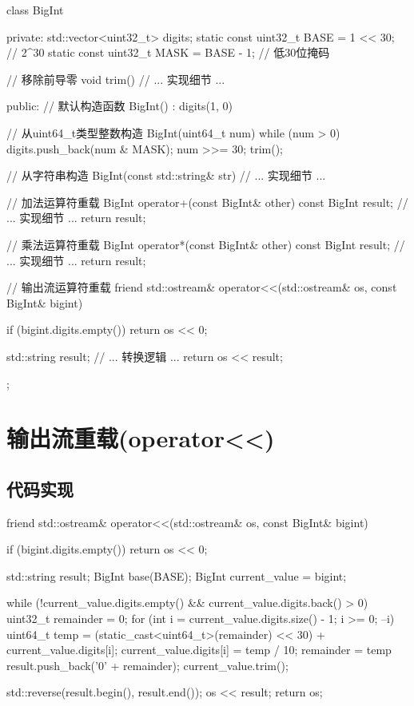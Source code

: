 \begin{cpplst}[breakable]
class BigInt {
private:
    std::vector<uint32_t> digits;
    static const uint32_t BASE = 1 << 30;  // 2^30
    static const uint32_t MASK = BASE - 1;  // 低30位掩码

    // 移除前导零
    void trim() {
        // ... 实现细节 ...
    }

public:
    // 默认构造函数
    BigInt() : digits(1, 0) {}

    // 从uint64_t类型整数构造
    BigInt(uint64_t num) {
        while (num > 0) {
            digits.push_back(num & MASK);
            num >>= 30;
        }
        trim();
    }

    // 从字符串构造
    BigInt(const std::string& str) {
        // ... 实现细节 ...
    }

    // 加法运算符重载
    BigInt operator+(const BigInt& other) const {
        BigInt result;
        // ... 实现细节 ...
        return result;
    }

    // 乘法运算符重载
    BigInt operator*(const BigInt& other) const {
        BigInt result;
        // ... 实现细节 ...
        return result;
    }

    // 输出流运算符重载
    friend std::ostream& operator<<(std::ostream& os, const BigInt& bigint) {
        if (bigint.digits.empty()) {
            return os << 0;
        }

        std::string result;
        // ... 转换逻辑 ...
        return os << result;
    }
};
\end{cpplst}


\section{输出流重载(operator<<)}

\subsection{代码实现}
\begin{cpplst}[breakable]
friend std::ostream& operator<<(std::ostream& os, const BigInt& bigint) {
    if (bigint.digits.empty()) {
        return os << 0;
    }

    std::string result;
    BigInt base(BASE);
    BigInt current_value = bigint;

    while (!current_value.digits.empty() && current_value.digits.back() > 0) {
        uint32_t remainder = 0;
        for (int i = current_value.digits.size() - 1; i >= 0; --i) {
            uint64_t temp = (static_cast<uint64_t>(remainder) << 30) + current_value.digits[i];
            current_value.digits[i] = temp / 10;
            remainder = temp %
        }
        result.push_back('0' + remainder);
        current_value.trim();
    }

    std::reverse(result.begin(), result.end());
    os << result;
    return os;
}
\end{cpplst}

